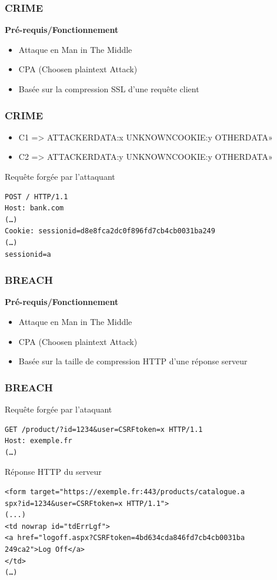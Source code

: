 \begin{frame}
  \frametitle{CRIME}
  \textbf{Pré-requis/Fonctionnement}
  \begin{itemize}
  \item Attaque en Man in The Middle
  \item CPA (Choosen plaintext Attack)
  \item Basée sur la compression SSL d'une requête client
  \end{itemize}
\end{frame}

\begin{frame}[fragile]
  \frametitle{CRIME}
  \begin{itemize}
  \item C1 => ATTACKERDATA:x UNKNOWNCOOKIE:y OTHERDATA»
  \item C2 => ATTACKERDATA:y UNKNOWNCOOKIE:y OTHERDATA»
  \end{itemize}
\pause

\begin{block}{Requête forgée par l'attaquant}
\begin{verbatim}
POST / HTTP/1.1
Host: bank.com
(…)
Cookie: sessionid=d8e8fca2dc0f896fd7cb4cb0031ba249
(…)
sessionid=a
\end{verbatim}
\end{block}
\end{frame}

\begin{frame}
  \frametitle{BREACH}
  \textbf{Pré-requis/Fonctionnement}
  \begin{itemize}
  \item Attaque en Man in The Middle
  \item CPA (Choosen plaintext Attack)
  \item Basée sur la taille de compression HTTP d'une réponse serveur
  \end{itemize}
\end{frame}

\begin{frame}[fragile]
  \frametitle{BREACH}

\begin{block}{ Requête forgée par l'ataquant }
\begin{verbatim}
GET /product/?id=1234&user=CSRFtoken=x HTTP/1.1
Host: exemple.fr
(…)
\end{verbatim}
\end{block}

\begin{block}{Réponse HTTP du serveur}
\begin{verbatim}
<form target="https://exemple.fr:443/products/catalogue.a
spx?id=1234&user=CSRFtoken=x HTTP/1.1">
(...)
<td nowrap id="tdErrLgf">
<a href="logoff.aspx?CSRFtoken=4bd634cda846fd7cb4cb0031ba
249ca2">Log Off</a>
</td>
(…)
\end{verbatim}
\end{block}
\end{frame}

